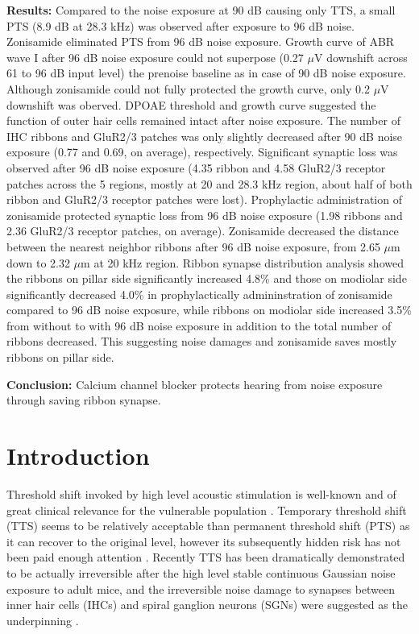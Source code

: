 \documentclass[11pt]{article}
\begin{document}
{\bf Results:} Compared to the noise exposure at 90 dB causing only TTS, a small PTS (8.9 dB at 28.3 kHz) was observed after exposure to 96 dB noise. Zonisamide eliminated PTS from 96 dB noise exposure. Growth curve of ABR wave I after 96 dB noise exposure could not superpose (0.27 $\mu$V downshift across 61 to 96 dB input level) the prenoise baseline as in case of 90 dB noise exposure. Although zonisamide could not fully protected the growth curve, only 0.2 $\mu$V downshift was oberved. DPOAE threshold and growth curve suggested the function of outer hair cells remained intact after noise exposure. The number of IHC ribbons and GluR2/3 patches was only slightly decreased after 90 dB noise exposure (0.77 and 0.69, on average),  respectively. Significant synaptic loss was observed after 96 dB noise exposure (4.35 ribbon and 4.58 GluR2/3 receptor patches across the 5 regions, mostly at 20 and 28.3 kHz region, about half of both ribbon and GluR2/3 receptor patches were lost). Prophylactic administration of zonisamide protected synaptic loss from 96 dB noise exposure (1.98 ribbons and 2.36 GluR2/3 receptor patches, on average). Zonisamide decreased the distance between the nearest neighbor ribbons after 96 dB noise exposure, from 2.65 $\mu$m down to 2.32 $\mu$m at 20 kHz region. Ribbon synapse distribution analysis showed the ribbons on pillar side significantly increased 4.8\% and those on modiolar side significantly decreased 4.0\% in prophylactically admininstration of zonisamide compared to 96 dB noise exposure, while ribbons on modiolar side increased 3.5\% from without to with 96 dB noise exposure in addition to the total number of ribbons decreased. This suggesting noise damages and zonisamide saves mostly ribbons on pillar side.

{\bf Conclusion:} Calcium channel blocker protects hearing from noise exposure through saving ribbon synapse.

\section {Introduction}
Threshold shift invoked by high level acoustic stimulation is well-known and of great clinical relevance for the vulnerable population \cite{Mahboubi2012}. Temporary threshold shift (TTS) seems to be relatively acceptable than permanent threshold shift (PTS) as it can recover to the original level, however its subsequently hidden risk has not been paid enough attention \cite{Melnick1991}. Recently TTS has been dramatically demonstrated to be actually irreversible after the high level stable continuous Gaussian noise exposure to adult mice, and the irreversible noise damage to synapses between inner hair cells (IHCs) and spiral ganglion neurons (SGNs) were suggested as the underpinning \cite{Kujawa2009}. 
\end{document}
